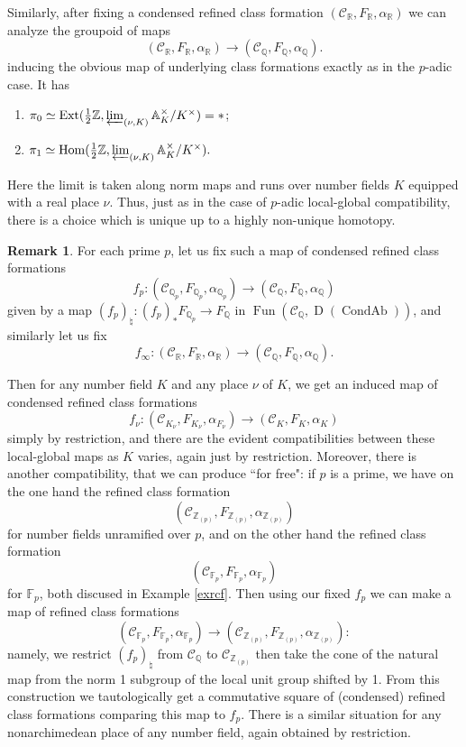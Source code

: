 \documentclass[12pt]{article}
\theoremstyle{definition}
\newtheorem{remark}[theorem]{Remark}
\newcommand{\on}{\operatorname}
\newcommand{\mc}{\mathcal}
\newcommand{\mbb}{\mathbb}
\begin{document}
Similarly, after fixing a condensed refined class formation $(\mc{C}_{\mbb{R}},F_{\mbb{R}},\alpha_{\mbb{R}})$ we can analyze the groupoid of maps
$$(\mc{C}_{\mbb{R}},F_{\mbb{R}},\alpha_{\mbb{R}}) \to (\mc{C}_{\mbb{Q}},F_{\mbb{Q}},\alpha_{\mbb{Q}}).$$
inducing the obvious map of underlying class formations exactly as in the $p$-adic case.  It has
\begin{enumerate}
\item $\pi_0 \simeq \on{Ext}(\frac{1}{2}\mbb{Z},\varprojlim_{(\nu,K)}\mbb{A}_K^\times/K^\times)=\ast$;
\item $\pi_1\simeq \on{Hom}(\frac{1}{2}\mbb{Z},\varprojlim_{(\nu,K)}\mbb{A}_K^\times/K^\times).$
\end{enumerate}
Here the limit is taken along norm maps and runs over number fields $K$ equipped with a real place $\nu$.  Thus, just as in the case of $p$-adic local-global compatibility, there is a choice which is unique up to a highly non-unique homotopy.
\begin{remark}\label{inducedlocalglobal}
For each prime $p$, let us fix such a map of condensed refined class formations
$$f_p: (\mc{C}_{\mbb{Q}_p},F_{\mbb{Q}_p},\alpha_{\mbb{Q}_p}) \to (\mc{C}_\mbb{Q},F_\mbb{Q},
\alpha_\mbb{Q})$$
given by a map $(f_p)_\natural: (f_p)_\ast F_{\mbb{Q}_p} \to F_{\mbb{Q}}$ in $\on{Fun}(\mc{C}_\mbb{Q},\on{D}(\on{CondAb}))$, and similarly let us fix
$$f_\infty : (\mc{C}_{\mbb{R}},F_{\mbb{R}},\alpha_{\mbb{R}}) \to (\mc{C}_\mbb{Q},F_\mbb{Q},
\alpha_\mbb{Q}).$$

Then for any number field $K$ and any place $\nu$ of $K$, we get an induced map of condensed refined class formations
$$f_\nu: (\mc{C}_{K_\nu},F_{K_\nu},\alpha_{F_\nu}) \to (\mc{C}_K,F_K,
\alpha_K)$$
simply by restriction, and there are the evident compatibilities between these local-global maps as $K$ varies, again just by restriction.  Moreover, there is another compatibility, that we can produce ``for free": if $p$ is a prime, we have on the one hand the refined class formation
$$(\mc{C}_{\mbb{Z}_{(p)}},F_{\mbb{Z}_{(p)}},\alpha_{\mbb{Z}_{(p)}})$$
for number fields unramified over $p$, and on the other hand the refined class formation
$$(\mc{C}_{\mbb{F}_{p}},F_{\mbb{F}_{p}},\alpha_{\mbb{F}_{p}})$$
for $\mbb{F}_p$, both discused in Example \ref{exrcf}.  Then using our fixed $f_p$ we can make a map of refined class formations
$$(\mc{C}_{\mbb{F}_{p}},F_{\mbb{F}_{p}},\alpha_{\mbb{F}_{p}})\to (\mc{C}_{\mbb{Z}_{(p)}},F_{\mbb{Z}_{(p)}},\alpha_{\mbb{Z}_{(p)}}):$$
namely, we restrict $(f_p)_\natural$ from $\mc{C}_{\mbb{Q}}$ to $\mc{C}_{\mbb{Z}_{(p)}}$ then take the cone of the natural map from the norm 1 subgroup of the local unit group shifted by 1.  From this construction we tautologically get a commutative square of (condensed) refined class formations comparing this map to $f_p$.  There is a similar situation for any nonarchimedean place of any number field, again obtained by restriction.
\end{remark}
\end{document}

